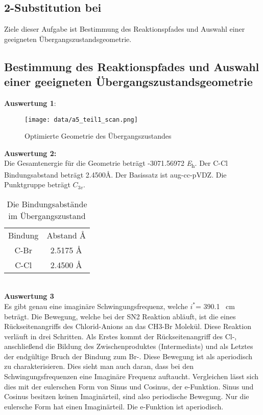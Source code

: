 \documentclass[12pt]{article}
\begin{document}
\begin{onehalfspace}

\section{2-Substitution bei }
Ziele dieser Aufgabe ist Bestimmung des Reaktionspfades und Auswahl einer geeigneten Übergangszustandsgeometrie.
\newpage
\subsection{Bestimmung des Reaktionspfades und Auswahl einer geeigneten Übergangszustandsgeometrie}
\textbf{Auswertung 1}:

\begin{figure}[!htbp]
\centering
  \texttt{[image: data/a5\_teil1\_scan.png]}%
  \caption{Optimierte Geometrie des Übergangszustandes}
\end{figure}
\noindent
\textbf{Auswertung 2:}\\
 Die Gesamtenergie für die Geometrie beträgt -3071.56972 \si{\hartree}.
Der C-Cl Bindungsabstand beträgt 2.4500\si{\angstrom}.
 Der Basissatz ist aug-cc-pVDZ. Die Punktgruppe beträgt $C _{3v}$.
\begin{table}[!htpb]
\centering
\begin{tabular}{cc}
\toprule
Bindung & Abstand \si{\angstrom}\\
C-Br  & 2.5175 \si{\angstrom}\\
C-Cl  & 2.4500 \si{\angstrom} \\
\midrule
\bottomrule
\end{tabular}
\caption{Die Bindungsabstände im Übergangszustand}
\end{table}\\
\noindent
\textbf{Auswertung 3}\\
Es gibt genau eine imaginäre Schwingungsfrequenz, welche $i^*$= 390.1 \si{\per\centi\meter} beträgt. Die Bewegung, welche bei der SN2 Reaktion abläuft, ist die eines Rückseitenangriffs des Chlorid-Anions an das CH3-Br Molekül. Diese Reaktion verläuft in drei Schritten. Als Erstes kommt der Rückseitenangriff des Cl-, anschließend die Bildung des Zwischenproduktes (Intermediats) und als Letztes der endgültige Bruch der Bindung zum Br-. Diese Bewegung ist als aperiodisch zu charakterisieren.
 Dies sieht man auch daran, dass bei den Schwingungsfrequenzen eine Imaginäre Frequenz auftaucht. Vergleichen lässt sich dies mit der eulerschen Form von Sinus und Cosinus, der e-Funktion. Sinus und Cosinus besitzen keinen Imaginärteil, sind also periodische Bewegung. Nur die eulersche Form hat einen Imaginärteil. Die e-Funktion ist aperiodisch.\\


\end{onehalfspace}
\end{document}
